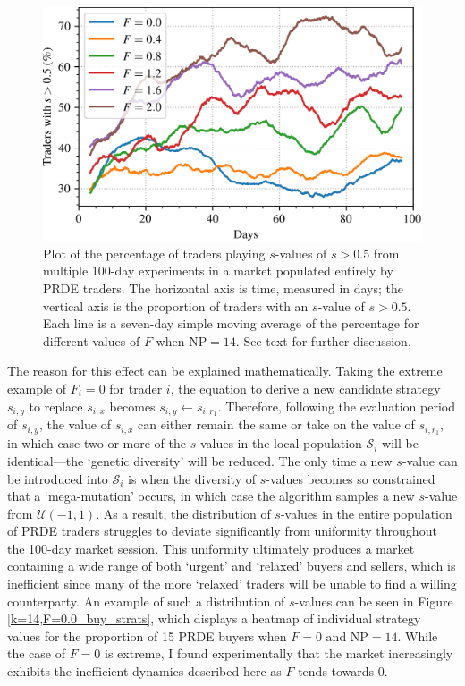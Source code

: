 \documentclass[conference]{IEEEtran}
\begin{document}
\begin{figure}[htbp]
    \centerline{\includegraphics[width=\columnwidth]{k=14_strats.png}}
    \caption{
        Plot of the percentage of traders playing $s$-values of $s>0.5$ from multiple 100-day experiments in a market populated entirely by PRDE traders.
        The horizontal axis is time, measured in days; the vertical axis is the proportion of traders with an $s$-value of $s>0.5$.
        Each line is a seven-day simple moving average of the percentage for different values of $F$ when $\mathrm{NP}=14$.
        See text for further discussion.
    }
    \label{k=14_strats}
\end{figure}

The reason for this effect can be explained mathematically.
Taking the extreme example of $F_i=0$ for trader $i$, the equation to derive a new candidate strategy $s_{i,y}$ to replace $s_{i,x}$ becomes $s_{i,y}\leftarrow s_{i,r_1}$.
Therefore, following the evaluation period of $s_{i,y}$, the value of $s_{i,x}$ can either remain the same or take on the value of $s_{i,r_1}$, in which case two or more of the $s$-values in the local population $\mathcal{S}_i$ will be identical---the `genetic diversity' will be reduced.
The only time a new $s$-value can be introduced into $\mathcal{S}_i$ is when the diversity of $s$-values becomes so constrained that a `mega-mutation' occurs, in which case the algorithm samples a new $s$-value from $\mathcal{U}(-1,1)$.
As a result, the distribution of $s$-values in the entire population of PRDE traders struggles to deviate significantly from uniformity throughout the 100-day market session.
This uniformity ultimately produces a market containing a wide range of both `urgent' and `relaxed' buyers and sellers, which is inefficient since many of the more `relaxed' traders will be unable to find a willing counterparty.
An example of such a distribution of $s$-values can be seen in Figure \ref{k=14,F=0.0_buy_strats}, which displays a heatmap of individual strategy values for the proportion of 15 PRDE buyers when $F=0$ and $\mathrm{NP}=14$.
While the case of $F=0$ is extreme, I found experimentally that the market increasingly exhibits the inefficient dynamics described here as $F$ tends towards $0$.
\end{document}
